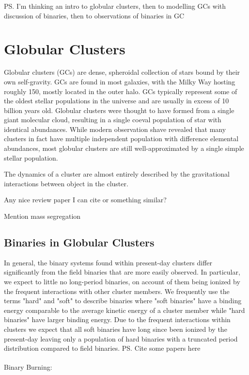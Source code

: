 \ps{I'm thinking an intro to globular clusters, then to modelling GCs with discussion of binaries,
	then to observations of binaries in GC}

\section{Globular Clusters}

Globular clusters (GCs) are dense, spheroidal collection of stars bound by their own self-gravity.
GCs are found in most galaxies, with the Milky Way hosting roughly 150, mostly located in the outer
halo. GCs typically represent some of the oldest stellar populations in the universe and are usually
in excess of 10 billion years old. Globular clusters were thought to have formed from a single giant
molecular cloud, resulting in a single coeval population of star with identical abundances. While
modern observation shave revealed that many clusters in fact have multiple independent population
with difference elemental abundances, most globular clusters are still well-approximated by a single
simple stellar population.

The dynamics of a cluster are almost entirely described by the gravitational interactions between
object in the cluster.

Any nice review paper I can cite or something similar?

Mention mass segregation

\subsection{Binaries in Globular Clusters}


In general, the binary systems found within present-day clusters differ significantly from the field
binaries that are more easily observed. In particular, we expect to little no long-period binaries,
on account of them being ionized by the frequent interactions with other cluster members. We
frequently use the terms "hard" and "soft" to describe binaries where "soft binaries" have a binding
energy comparable to the average kinetic energy of a cluster member while "hard binaries" have
larger binding energy. Due to the frequent interactions within clusters we expect that all soft
binaries have long since been ionized by the present-day leaving only a population of hard binaries
with a truncated period distribution compared to field binaries.
\ps{Cite some papers here}

\paragraph{}
Binary Burning: \citet{Chatterjee2013}


